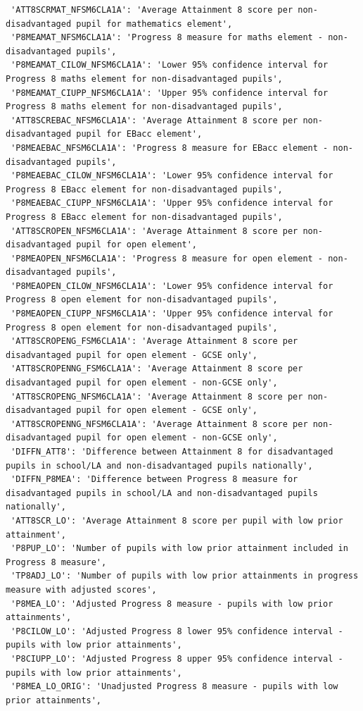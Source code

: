 \documentclass[
  letterpaper,
  DIV=11,
  numbers=noendperiod]{scrartcl}
\begin{document}
\begin{verbatim}
 'ATT8SCRMAT_NFSM6CLA1A': 'Average Attainment 8 score per non-disadvantaged pupil for mathematics element',
 'P8MEAMAT_NFSM6CLA1A': 'Progress 8 measure for maths element - non-disadvantaged pupils',
 'P8MEAMAT_CILOW_NFSM6CLA1A': 'Lower 95% confidence interval for Progress 8 maths element for non-disadvantaged pupils',
 'P8MEAMAT_CIUPP_NFSM6CLA1A': 'Upper 95% confidence interval for Progress 8 maths element for non-disadvantaged pupils',
 'ATT8SCREBAC_NFSM6CLA1A': 'Average Attainment 8 score per non-disadvantaged pupil for EBacc element',
 'P8MEAEBAC_NFSM6CLA1A': 'Progress 8 measure for EBacc element - non-disadvantaged pupils',
 'P8MEAEBAC_CILOW_NFSM6CLA1A': 'Lower 95% confidence interval for Progress 8 EBacc element for non-disadvantaged pupils',
 'P8MEAEBAC_CIUPP_NFSM6CLA1A': 'Upper 95% confidence interval for Progress 8 EBacc element for non-disadvantaged pupils',
 'ATT8SCROPEN_NFSM6CLA1A': 'Average Attainment 8 score per non-disadvantaged pupil for open element',
 'P8MEAOPEN_NFSM6CLA1A': 'Progress 8 measure for open element - non-disadvantaged pupils',
 'P8MEAOPEN_CILOW_NFSM6CLA1A': 'Lower 95% confidence interval for Progress 8 open element for non-disadvantaged pupils',
 'P8MEAOPEN_CIUPP_NFSM6CLA1A': 'Upper 95% confidence interval for Progress 8 open element for non-disadvantaged pupils',
 'ATT8SCROPENG_FSM6CLA1A': 'Average Attainment 8 score per disadvantaged pupil for open element - GCSE only',
 'ATT8SCROPENNG_FSM6CLA1A': 'Average Attainment 8 score per disadvantaged pupil for open element - non-GCSE only',
 'ATT8SCROPENG_NFSM6CLA1A': 'Average Attainment 8 score per non-disadvantaged pupil for open element - GCSE only',
 'ATT8SCROPENNG_NFSM6CLA1A': 'Average Attainment 8 score per non-disadvantaged pupil for open element - non-GCSE only',
 'DIFFN_ATT8': 'Difference between Attainment 8 for disadvantaged pupils in school/LA and non-disadvantaged pupils nationally',
 'DIFFN_P8MEA': 'Difference between Progress 8 measure for disadvantaged pupils in school/LA and non-disadvantaged pupils nationally',
 'ATT8SCR_LO': 'Average Attainment 8 score per pupil with low prior attainment',
 'P8PUP_LO': 'Number of pupils with low prior attainment included in Progress 8 measure',
 'TP8ADJ_LO': 'Number of pupils with low prior attainments in progress measure with adjusted scores',
 'P8MEA_LO': 'Adjusted Progress 8 measure - pupils with low prior attainments',
 'P8CILOW_LO': 'Adjusted Progress 8 lower 95% confidence interval - pupils with low prior attainments',
 'P8CIUPP_LO': 'Adjusted Progress 8 upper 95% confidence interval - pupils with low prior attainments',
 'P8MEA_LO_ORIG': 'Unadjusted Progress 8 measure - pupils with low prior attainments',

\end{verbatim}
\end{document}
